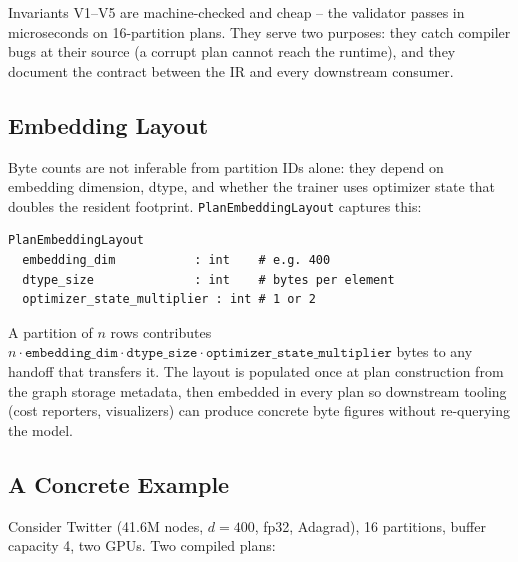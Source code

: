 Invariants V1--V5 are machine-checked and cheap -- the validator
passes in microseconds on 16-partition plans. They serve two
purposes: they catch compiler bugs at their source (a corrupt plan
cannot reach the runtime), and they document the contract between the
IR and every downstream consumer.

\subsection{Embedding Layout}\label{sec:ir:layout}

Byte counts are not inferable from partition IDs alone: they depend on
embedding dimension, dtype, and whether the trainer uses optimizer
state that doubles the resident footprint. \texttt{PlanEmbeddingLayout}
captures this:

\begin{lstlisting}[basicstyle=\ttfamily\footnotesize]
PlanEmbeddingLayout
  embedding_dim           : int    # e.g. 400
  dtype_size              : int    # bytes per element
  optimizer_state_multiplier : int # 1 or 2
\end{lstlisting}

\noindent
A partition of $n$ rows contributes
$n \cdot \mathtt{embedding\_dim} \cdot \mathtt{dtype\_size}
     \cdot \mathtt{optimizer\_state\_multiplier}$ bytes to any handoff
that transfers it. The layout is populated once at plan construction
from the graph storage metadata, then embedded in every plan so
downstream tooling (cost reporters, visualizers) can produce concrete
byte figures without re-querying the model.

\subsection{A Concrete Example}\label{sec:ir:example}

Consider Twitter (41.6M nodes, $d\!=\!400$, fp32, Adagrad), 16
partitions, buffer capacity 4, two GPUs. Two compiled plans:

